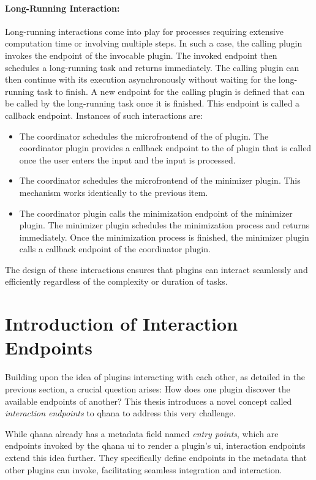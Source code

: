 \documentclass[
  a4paper,  %
  twoside,  %
  bibliography=totoc,
  headsepline,
  cleardoublepage=empty,
  parskip=half,
  draft=false
]{scrbook}
\begin{document}
\paragraph{Long-Running Interaction:}

Long-running interactions come into play for processes requiring extensive computation time or involving multiple steps.
In such a case, the calling plugin invokes the endpoint of the invocable plugin.
The invoked endpoint then schedules a long-running task and returns immediately.
The calling plugin can then continue with its execution asynchronously without waiting for the long-running task to finish.
A new endpoint for the calling plugin is defined that can be called by the long-running task once it is finished.
This endpoint is called a callback endpoint.
Instances of such interactions are:
\begin{itemize}
    \item The coordinator schedules the microfrontend of the \gls{of} plugin.
    The coordinator plugin provides a callback endpoint to the \gls{of} plugin that is called once the user enters the input and the input is processed.
    \item The coordinator schedules the microfrontend of the minimizer plugin.
    This mechanism works identically to the previous item.
    \item The coordinator plugin calls the minimization endpoint of the minimizer plugin.
    The minimizer plugin schedules the minimization process and returns immediately.
    Once the minimization process is finished, the minimizer plugin calls a callback endpoint of the coordinator plugin.
\end{itemize}
The design of these interactions ensures that plugins can interact seamlessly and efficiently regardless of the complexity or duration of tasks.

\section{Introduction of Interaction Endpoints}
\label{sec:introie}

Building upon the idea of plugins interacting with each other, as detailed in the previous section, a crucial question arises:
How does one plugin discover the available endpoints of another?
This thesis introduces a novel concept called \textit{interaction endpoints} to \gls{qhana} to address this very challenge.

While \gls{qhana} already has a metadata field named \emph{entry points}, which are endpoints invoked by the \gls{qhana} \gls{ui} to render a plugin's \gls{ui}, interaction endpoints extend this idea further.
They specifically define endpoints in the metadata that other plugins can invoke, facilitating seamless integration and interaction.
\end{document}
